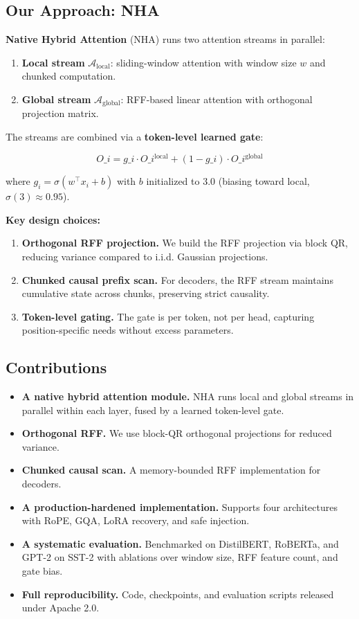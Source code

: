 \subsection{Our Approach: NHA}

\textbf{Native Hybrid Attention} (NHA) runs two attention streams in parallel:

\begin{enumerate}
\item \textbf{Local stream} $\mathcal{A}_\text{local}$: sliding-window attention with
  window size $w$ and chunked computation.
\item \textbf{Global stream} $\mathcal{A}_\text{global}$: RFF-based linear attention
  with orthogonal projection matrix.

\end{enumerate}
The streams are combined via a \textbf{token-level learned gate}:

\[
O\_i = g\_i \cdot O\_i^\text{local} + (1 - g\_i) \cdot O\_i^\text{global}
\tag{1.1}
\]

where $g_i = \sigma(w^\top x_i + b)$ with $b$ initialized to $3.0$ (biasing 
toward local, $\sigma(3) \approx 0.95$).

\textbf{Key design choices:}

\begin{enumerate}
\item \textbf{Orthogonal RFF projection.} We build the RFF projection via block QR,
  reducing variance compared to i.i.d. Gaussian projections.
\item \textbf{Chunked causal prefix scan.} For decoders, the RFF stream maintains
  cumulative state across chunks, preserving strict causality.
\item \textbf{Token-level gating.} The gate is per token, not per head, capturing
  position-specific needs without excess parameters.

\end{enumerate}
\subsection{Contributions}

\begin{itemize}
\item \textbf{A native hybrid attention module.} NHA runs local and global streams in
  parallel within each layer, fused by a learned token-level gate.
\item \textbf{Orthogonal RFF.} We use block-QR orthogonal projections for reduced
  variance.
\item \textbf{Chunked causal scan.} A memory-bounded RFF implementation for decoders.
\item \textbf{A production-hardened implementation.} Supports four architectures
  with RoPE, GQA, LoRA recovery, and safe injection.
\item \textbf{A systematic evaluation.} Benchmarked on DistilBERT, RoBERTa, and GPT-2
  on SST-2 with ablations over window size, RFF feature count, and gate bias.
\item \textbf{Full reproducibility.} Code, checkpoints, and evaluation scripts released
  under Apache 2.0.

\end{itemize}
